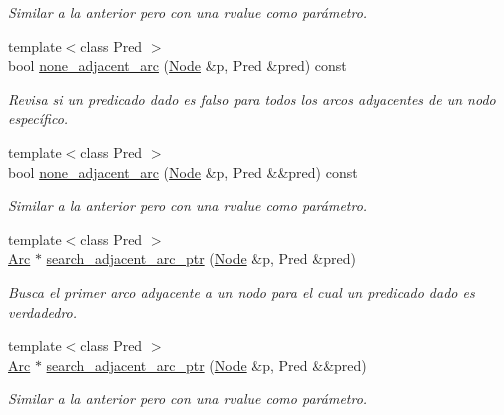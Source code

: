 \begin{DoxyCompactItemize}
\begin{DoxyCompactList}\small\item\em Similar a la anterior pero con una rvalue como parámetro. \end{DoxyCompactList}\item 
{\footnotesize template$<$class Pred $>$ }\\bool \hyperlink{class_designar_1_1_base_graph_acf4b230e0d981f36770722011c96206f}{none\+\_\+adjacent\+\_\+arc} (\hyperlink{namespace_designar_a5af326c65aa2bd26b26c410f2030d09e}{Node} \&p, Pred \&pred) const
\begin{DoxyCompactList}\small\item\em Revisa si un predicado dado es falso para todos los arcos adyacentes de un nodo específico. \end{DoxyCompactList}\item 
{\footnotesize template$<$class Pred $>$ }\\bool \hyperlink{class_designar_1_1_base_graph_adbacdf829cb2f21aff498bac9c9a8b8b}{none\+\_\+adjacent\+\_\+arc} (\hyperlink{namespace_designar_a5af326c65aa2bd26b26c410f2030d09e}{Node} \&p, Pred \&\&pred) const
\begin{DoxyCompactList}\small\item\em Similar a la anterior pero con una rvalue como parámetro. \end{DoxyCompactList}\item 
{\footnotesize template$<$class Pred $>$ }\\\hyperlink{namespace_designar_a3f55fb5513d62ff47cbc8f72b8e95d6f}{Arc} $\ast$ \hyperlink{class_designar_1_1_base_graph_a0fc6cebdbc639235992617c49f8d395e}{search\+\_\+adjacent\+\_\+arc\+\_\+ptr} (\hyperlink{namespace_designar_a5af326c65aa2bd26b26c410f2030d09e}{Node} \&p, Pred \&pred)
\begin{DoxyCompactList}\small\item\em Busca el primer arco adyacente a un nodo para el cual un predicado dado es verdadedro. \end{DoxyCompactList}\item 
{\footnotesize template$<$class Pred $>$ }\\\hyperlink{namespace_designar_a3f55fb5513d62ff47cbc8f72b8e95d6f}{Arc} $\ast$ \hyperlink{class_designar_1_1_base_graph_ab556185621be46883278bb3d707ab32b}{search\+\_\+adjacent\+\_\+arc\+\_\+ptr} (\hyperlink{namespace_designar_a5af326c65aa2bd26b26c410f2030d09e}{Node} \&p, Pred \&\&pred)
\begin{DoxyCompactList}\small\item\em Similar a la anterior pero con una rvalue como parámetro. \end{DoxyCompactList}\item 

\end{DoxyCompactItemize}
